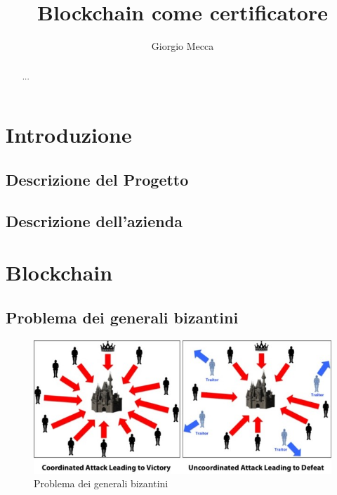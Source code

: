 \documentclass[a4paper]{report}
\begin{document}
\author{Giorgio Mecca}
\title{Blockchain come certificatore}
\maketitle

\begin{abstract} 
... 
\end{abstract}

\tableofcontents

\chapter{Introduzione}
\section{Descrizione del Progetto}
\section{Descrizione dell’azienda}

\chapter{Blockchain}
\section{Problema dei generali bizantini}
\begin{figure}[h]
	\includegraphics[width=\textwidth]{BF}
	\centering
	\caption{Problema dei generali bizantini}
	\label{fig:ByzantinFault}
\end{figure}
\end{document}
